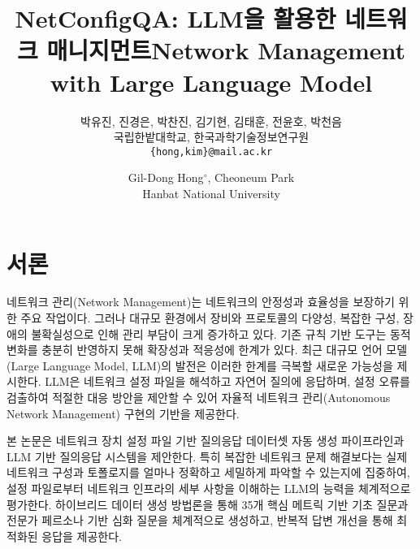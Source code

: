 \documentclass[twocolumn, 10pt]{article}
\title[korean]{NetConfigQA: LLM을 활용한 네트워크 매니지먼트}
\title[english]{Network Management with Large Language Model}
\author[korean]{박유진\footnotemark[1], 진경은\footnotemark[1], 박찬진, 김기현,
김태훈, 전윤호, 박천음\footnotemark[2] \\
국립한밭대학교, 한국과학기술정보연구원 \\
\texttt{\{hong,kim\}@mail.ac.kr}\\
}
\author[english]{ Gil-Dong Hong$^{\circ}$, Cheoneum Park \\
Hanbat National University }
\begin{document}


  
\section{서론}
네트워크 관리(Network Management)는 네트워크의 안정성과 효율성을 보장하기 위한 주요 작업이다.
그러나 대규모 환경에서 장비와 프로토콜의 다양성, 복잡한 구성, 장애의 불확실성으로 인해 관리 부담이 크게 증가하고 있다. 기존 규칙 기반 도구는 동적 변화를 충분히 반영하지 못해 확장성과 적응성에 한계가 있다.
최근 대규모 언어 모델(Large Language Model, LLM)의 발전은 이러한 한계를 극복할 새로운 가능성을 제시한다.
LLM은 네트워크 설정 파일을 해석하고 자연어 질의에 응답하며, 설정 오류를 검출하여 적절한 대응 방안을 제안할 수 있어 자율적 네트워크 관리(Autonomous Network Management) 구현의 기반을 제공한다.

본 논문은 네트워크 장치 설정 파일 기반 질의응답 데이터셋 자동 생성 파이프라인과 LLM 기반 질의응답 시스템을 제안한다. 
특히 복잡한 네트워크 문제 해결보다는 실제 네트워크 구성과 토폴로지를 얼마나 정확하고 세밀하게 파악할 수 있는지에 집중하여, 설정 파일로부터 네트워크 인프라의 세부 사항을 이해하는 LLM의 능력을 체계적으로 평가한다. 
하이브리드 데이터 생성 방법론을 통해 35개 핵심 메트릭 기반 기초 질문과 전문가 페르소나 기반 심화 질문을 체계적으로 생성하고, 반복적 답변 개선을 통해 최적화된 응답을 제공한다.


\end{document}
